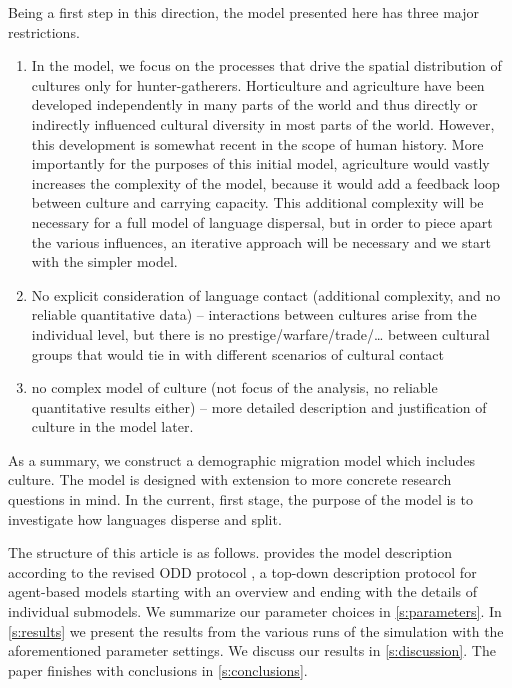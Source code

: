\documentclass[a4paper,12pt]{scrartcl}
\begin{document}
Being a first step in this direction, the model presented here has three major restrictions.
\begin{enumerate}
\item In the model, we focus on the processes that drive the spatial
  distribution of cultures only for hunter-gatherers. Horticulture and
  agriculture have been developed independently in many parts of the world
  \parencite{} and thus directly or indirectly influenced cultural diversity in
  most parts of the world. However, this development is somewhat recent in the
  scope of human history. More importantly for the purposes of this initial
  model, agriculture would vastly increases the complexity of the model, because
  it would add a feedback loop between culture and carrying capacity. This
  additional complexity will be necessary for a full model of language
  dispersal, but in order to piece apart the various influences, an iterative
  approach will be necessary and we start with the simpler model.
\item No explicit consideration of language contact (additional complexity, and
  no reliable quantitative data) – interactions between cultures arise from the
  individual level, but there is no prestige/warfare/trade/… between cultural
  groups that would tie in with different scenarios of cultural contact
\item no complex model of culture (not focus of the analysis, no reliable
  quantitative results either) – more detailed description and justification of
  culture in the model later.
\end{enumerate}

As a summary, we construct a demographic migration model which includes culture.
The model is designed with extension to more concrete research questions in
mind. In the current, first stage, the purpose of the model is to investigate
how languages disperse and split.

The structure of this article is as follows.  provides the model
description according to the revised ODD protocol
\parencite{grimm2006standard,grimm2010odd}, a top-down description protocol for
agent-based models starting with an overview and ending with the details of
individual submodels. We summarize our parameter choices in \cref{s:parameters}.
In \cref{s:results} we present the results from the various runs of the
simulation with the aforementioned parameter settings. We discuss our results in
\cref{s:discussion}. The paper finishes with conclusions in
\cref{s:conclusions}.
\end{document}
